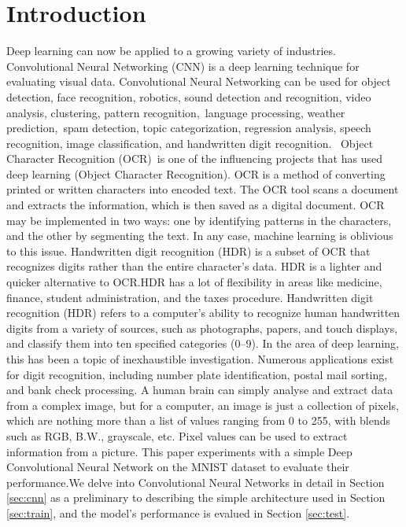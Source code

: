 \documentclass[conference]{IEEEtran}
\begin{document}
\section{Introduction}
Deep learning can now be applied to a growing variety of industries. Convolutional Neural Networking (CNN) is a deep learning technique for evaluating visual data. Convolutional Neural Networking can be used for object detection, face recognition, robotics, sound detection and recognition, video analysis, clustering, pattern recognition, language processing, weather prediction, spam detection, topic categorization, regression analysis, speech recognition, image classification, and handwritten digit recognition.
 Object Character Recognition (OCR) is one of the influencing projects that has used deep learning (Object Character Recognition). OCR is a method of converting printed or written characters into encoded text. The OCR tool scans a document and extracts the information, which is then saved as a digital document. OCR may be implemented in two ways: one by identifying patterns in the characters, and the other by segmenting the text. In any case, machine learning is oblivious to this issue. Handwritten digit recognition (HDR) is a subset of OCR that recognizes digits rather than the entire character's data. HDR is a lighter and quicker alternative to OCR.\@ HDR has a lot of flexibility in areas like medicine, finance, student administration, and the taxes procedure.
Handwritten digit recognition (HDR) refers to a computer's ability to recognize human handwritten digits from a variety of sources, such as photographs, papers, and touch displays, and classify them into ten specified categories (0--9). In the area of deep learning, this has been a topic of inexhaustible investigation. Numerous applications exist for digit recognition, including number plate identification, postal mail sorting, and bank check processing. A human brain can simply analyse and extract data from a complex image, but for a computer, an image is just a collection of pixels, which are nothing more than a list of values ranging from 0 to 255, with blends such as RGB, B.W., grayscale, etc. Pixel values can be used to extract information from a picture.
This paper experiments with a simple Deep Convolutional Neural Network on the MNIST\cite{6296535} dataset to evaluate their performance.\@ We delve into Convolutional Neural Networks in detail in Section \ref{sec:cnn} as a preliminary to describing the simple architecture used in Section \ref{sec:train}, and the model's performance is evalued in Section \ref{sec:test}.
\end{document}
